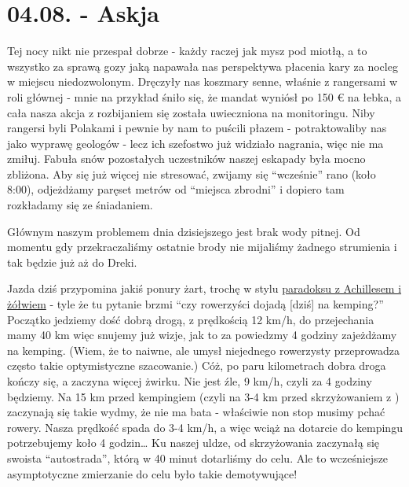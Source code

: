 \chapter*{04.08. - Askja}

Tej nocy nikt nie przespał dobrze - każdy raczej jak mysz pod miotłą, a to wszystko za sprawą gozy jaką  napawała nas perspektywa płacenia kary za nocleg w miejscu niedozwolonym. Dręczyły nas koszmary senne, właśnie z rangersami w roli głównej - mnie na przykład śniło się, że mandat wyniósł po 150 € na łebka, a cała nasza akcja z rozbijaniem się została uwieczniona na monitoringu. Niby rangersi byli Polakami i pewnie by nam to puścili płazem - potraktowaliby nas jako wyprawę geologów - lecz ich szefostwo już widziało nagrania, więc nie ma zmiłuj. Fabuła snów pozostałych uczestników naszej eskapady była mocno zbliżona. Aby się już więcej nie stresować, zwijamy się “wcześnie” rano (koło 8:00), odjeżdżamy paręset metrów od “miejsca zbrodni” i dopiero tam rozkładamy się ze śniadaniem.

Głównym naszym problemem dnia dzisiejszego jest brak wody pitnej. Od momentu gdy przekraczaliśmy ostatnie brody nie mijaliśmy żadnego strumienia i tak będzie już aż do Dreki.



Jazda dziś przypomina jakiś ponury żart, trochę w stylu \href{http://pl.wikipedia.org/wiki/Paradoksy_Zenona_z_Elei#Achilles_i_.C5.BC.C3.B3.C5.82w.5B2.5D}{paradoksu z Achillesem i żółwiem} - tyle że tu pytanie brzmi “czy rowerzyści dojadą [dziś] na kemping?” Początko jedziemy dość dobrą drogą, z prędkością 12 km/h, do przejechania mamy 40 km więc snujemy już wizje, jak to za powiedzmy 4 godziny zajeżdżamy na kemping. (Wiem, że to naiwne, ale umysł niejednego rowerzysty przeprowadza często takie optymistyczne szacowanie.) Cóż, po paru kilometrach dobra droga kończy się, a zaczyna więcej żwirku. Nie jest źle, 9 km/h, czyli za 4 godziny będziemy. Na 15 km przed kempingiem (czyli na 3-4 km przed skrzyżowaniem z ) zaczynają się takie wydmy, że nie ma bata - właściwie non stop musimy pchać rowery. Nasza prędkość spada do 3-4 km/h, a więc wciąż na dotarcie do kempingu potrzebujemy koło 4 godzin… Ku naszej uldze, od skrzyżowania zaczynałą się swoista “autostrada”, którą w 40 minut dotarliśmy do celu. Ale to wcześniejsze asymptotyczne zmierzanie do celu było takie demotywujące!

